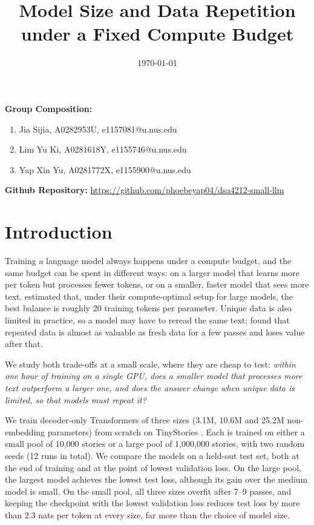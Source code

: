 \documentclass[12pt]{article}
\begin{document}
\title{Model Size and Data Repetition under a Fixed Compute Budget}
\date{\today}
\maketitle

{\bf Group Composition:}
\begin{enumerate}
\item {Jia Sijia, A0282953U, e1157081@u.nus.edu}
\item {Lim Yu Ki, A0281618Y, e1155746@u.nus.edu}
\item {Yap Xin Yu, A0281772X, e1155900@u.nus.edu}
\end{enumerate}

{\bf Github Repository:} \url{https://github.com/phoebeyap04/dsa4212-small-llm}

\section{Introduction}

Training a language model always happens under a compute budget, and the same budget can be spent in different ways: on a larger model that learns more per token but processes fewer tokens, or on a smaller, faster model that sees more text. \citet{hoffmann2022training} estimated that, under their compute-optimal setup for large models, the best balance is roughly 20 training tokens per parameter. Unique data is also limited in practice, so a model may have to reread the same text; \citet{muennighoff2023scaling} found that repeated data is almost as valuable as fresh data for a few passes and loses value after that.
 
We study both trade-offs at a small scale, where they are cheap to test: \emph{within one hour of training on a single GPU, does a smaller model that processes more text outperform a larger one, and does the answer change when unique data is limited, so that models must repeat it?}
 
We train decoder-only Transformers of three sizes (3.1M, 10.6M and 25.2M non-embedding parameters) from scratch on TinyStories \citep{eldan2023tinystories}. Each is trained on either a small pool of 10,000 stories or a large pool of 1,000,000 stories, with two random seeds (12 runs in total). We compare the models on a held-out test set, both at the end of training and at the point of lowest validation loss. On the large pool, the largest model achieves the lowest test loss, although its gain over the medium model is small. On the small pool, all three sizes overfit after 7--9 passes, and keeping the checkpoint with the lowest validation loss reduces test loss by more than 2.3 nats per token at every size, far more than the choice of model size.
\end{document}
